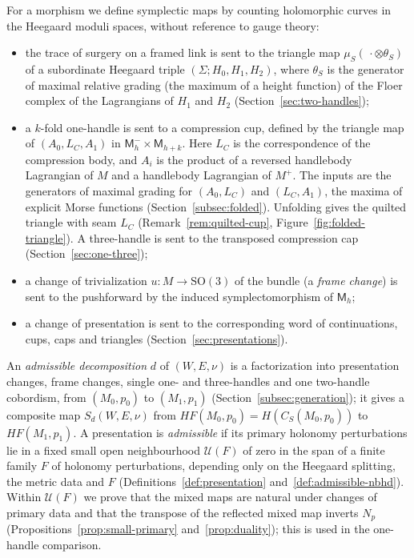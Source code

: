 \documentclass[11pt]{amsart}
\theoremstyle{definition}
\theoremstyle{remark}
\theoremstyle{plain}
\numberwithin{equation}{section}
\newcommand{\SO}{\mathrm{SO}}
\newcommand{\HF}{\mathit{HF}}
\newcommand{\Msf}{\mathsf{M}}
\begin{document}
For a morphism we define symplectic maps by counting holomorphic curves
in the Heegaard moduli spaces, without reference to gauge theory:
\begin{itemize}[leftmargin=2em]
\item the trace of surgery on a framed link is sent to the triangle map
  $\mu_S(\,\cdot\otimes\theta_S)$ of a subordinate Heegaard triple
  $(\Sigma;H_0,H_1,H_2)$, where $\theta_S$ is the generator of maximal relative grading (the maximum of a height function) of the Floer complex of the Lagrangians of $H_1$ and $H_2$ (Section~\ref{sec:two-handles});
\item a $k$-fold one-handle is sent to a compression cup, defined by the
  triangle map of $(A_0,L_C,A_1)$ in $\Msf_h^-\times\Msf_{h+k}$.
  Here $L_C$ is the correspondence of the compression body, and $A_i$ is the
  product of a reversed handlebody Lagrangian of $M$ and a handlebody
  Lagrangian of $M^+$. The inputs are the generators of maximal grading
  for $(A_0,L_C)$ and $(L_C,A_1)$, the maxima of explicit Morse functions
  (Section~\ref{subsec:folded}). Unfolding gives the quilted triangle with
  seam $L_C$ (Remark~\ref{rem:quilted-cup},
  Figure~\ref{fig:folded-triangle}). A three-handle is sent to the transposed
  compression cap (Section~\ref{sec:one-three});
\item a change of trivialization $u\colon M\to\SO(3)$ of the bundle (a
  \emph{frame change}) is sent to the pushforward by the induced
  symplectomorphism of $\Msf_h$;
\item a change of presentation is sent to the corresponding word of
  continuations, cups, caps and triangles (Section~\ref{sec:presentations}).
\end{itemize}
An \emph{admissible decomposition} $d$ of $(W,E,\nu)$ is a factorization into
presentation changes, frame changes, single one- and three-handles and one
two-handle cobordism, from $(M_0,p_0)$ to $(M_1,p_1)$
(Section~\ref{subsec:generation}); it gives a composite map $S_d(W,E,\nu)$ from
$\HF(M_0,p_0)=H(C_S(M_0,p_0))$ to $\HF(M_1,p_1)$. A presentation is \emph{admissible} if its primary holonomy perturbations lie in a fixed
small open neighbourhood $\mathcal U(F)$ of zero in the span of a finite family $F$ of
holonomy perturbations, depending only on the Heegaard splitting, the metric data and $F$
(Definitions~\ref{def:presentation} and~\ref{def:admissible-nbhd}). Within $\mathcal U(F)$ we
prove that the mixed maps are natural under changes of primary data and that the transpose
of the reflected mixed map inverts $N_p$ (Propositions~\ref{prop:small-primary}
and~\ref{prop:duality}); this is used in the one-handle comparison.
\end{document}
